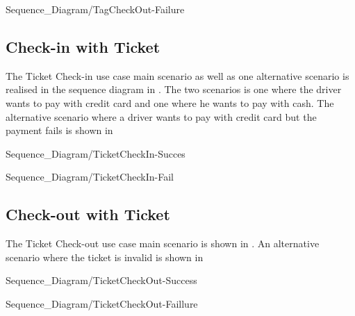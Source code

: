 \begin{mylandscapefigure}{Sequence_Diagram/TagCheckOut-Failure}
\caption{Alternative scenarios for the Tag Check-out use case. \madeby{\mb}{\af}}
\label{fig:tag-out-fail}
\end{mylandscapefigure}



\subsection{Check-in with Ticket}
\madeby{\kj}{\mt}
The Ticket Check-in use case main scenario as well as one alternative scenario is realised in the sequence diagram in . The two scenarios is one where the driver wants to pay with credit card and one where he wants to pay with cash. The alternative scenario where a driver wants to pay with credit card but the payment fails is shown in 
\begin{mylandscapefigure}{Sequence_Diagram/TicketCheckIn-Succes}
\caption{Success scenario for the Ticket Check-in use case. \madeby{\kj}{\mt}}
\label{fig:ticket-in-success}
\end{mylandscapefigure}

\begin{mylandscapefigure}{Sequence_Diagram/TicketCheckIn-Fail}
\caption{Alternative scenario for the Ticket Check-in use case. \madeby{\kj}{\mt}}
\label{fig:ticket-in-fail}
\end{mylandscapefigure}



\subsection{Check-out with Ticket}
\madeby{\jb}{\af}
The Ticket Check-out use case main scenario is shown in . An alternative scenario where the ticket is invalid is shown in 
\begin{mylandscapefigure}{Sequence_Diagram/TicketCheckOut-Success}
\caption{Main scenario for the Ticket Check-out use case. \madeby{\jb}{\af}}
\label{fig:ticket-out-success}
\end{mylandscapefigure}

\begin{mylandscapefigure}{Sequence_Diagram/TicketCheckOut-Faillure}
\caption{Alternative scenario for the Ticket Check-out use case. \madeby{\jb}{\af}}
\label{fig:ticket-out-fail}
\end{mylandscapefigure}



